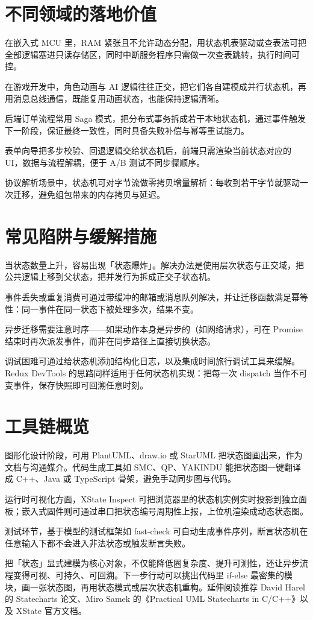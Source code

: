 \chapter{不同领域的落地价值}
在嵌入式 MCU 里，RAM 紧张且不允许动态分配，用状态机表驱动或查表法可把全部逻辑塞进只读存储区，同时中断服务程序只需做一次查表跳转，执行时间可控。\par
在游戏开发中，角色动画与 AI 逻辑往往正交，把它们各自建模成并行状态机，再用消息总线通信，既能复用动画状态，也能保持逻辑清晰。\par
后端订单流程常用 Saga 模式，把分布式事务拆成若干本地状态机，通过事件触发下一阶段，保证最终一致性，同时具备失败补偿与幂等重试能力。\par
表单向导把多步校验、回退逻辑交给状态机后，前端只需渲染当前状态对应的 UI，数据与流程解耦，便于 A/B 测试不同步骤顺序。\par
协议解析场景中，状态机可对字节流做零拷贝增量解析：每收到若干字节就驱动一次迁移，避免组包带来的内存拷贝与延迟。\par
\chapter{常见陷阱与缓解措施}
当状态数量上升，容易出现「状态爆炸」。解决办法是使用层次状态与正交域，把公共逻辑上移到父状态，把并发行为拆成正交子状态机。\par
事件丢失或重复消费可通过带缓冲的邮箱或消息队列解决，并让迁移函数满足幂等性：同一事件在同一状态下被处理多次，结果不变。\par
异步迁移需要注意时序——如果动作本身是异步的（如网络请求），可在 Promise 结束时再次派发事件，而非在同步路径上直接切换状态。\par
调试困难可通过给状态机添加结构化日志，以及集成时间旅行调试工具来缓解。Redux DevTools 的思路同样适用于任何状态机实现：把每一次 dispatch 当作不可变事件，保存快照即可回溯任意时刻。\par
\chapter{工具链概览}
图形化设计阶段，可用 PlantUML、draw.io 或 StarUML 把状态图画出来，作为文档与沟通媒介。代码生成工具如 SMC、QP、YAKINDU 能把状态图一键翻译成 C++、Java 或 TypeScript 骨架，避免手动同步图与代码。\par
运行时可视化方面，XState Inspect 可把浏览器里的状态机实例实时投影到独立面板；嵌入式固件则可通过串口把状态编号周期性上报，上位机渲染成动态状态图。\par
测试环节，基于模型的测试框架如 fast-check 可自动生成事件序列，断言状态机在任意输入下都不会进入非法状态或触发断言失败。\par
把「状态」显式建模为核心对象，不仅能降低圈复杂度、提升可测性，还让异步流程变得可视、可持久、可回溯。下一步行动可以挑出代码里 if-else 最密集的模块，画一张状态图，再用状态模式或层次状态机重构。延伸阅读推荐 David Harel 的 Statecharts 论文、Miro Samek 的《Practical UML Statecharts in C/C++》以及 XState 官方文档。\par
